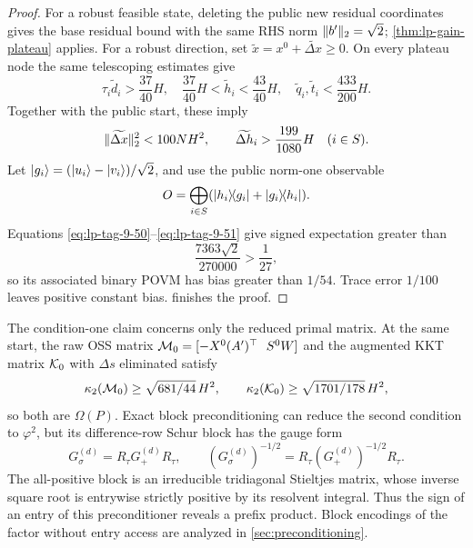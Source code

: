 \begin{proof}
For a robust feasible state, deleting the public new residual coordinates
gives the base residual bound with the same RHS norm
\(\lVert b'\rVert_2=\sqrt2\); \cref{thm:lp-gain-plateau} applies.  For a
robust direction, set \(\widetilde x=x^0+\widetilde{\Delta x}\geq0\).  On
every plateau node the same telescoping estimates give
\begin{equation}
 \tau_i\widetilde d_i>\frac{37}{40}H,\quad
 \frac{37}{40}H<\widetilde h_i<\frac{43}{40}H,\quad
 \widetilde q_i,\widetilde t_i<\frac{433}{200}H.
\label{eq:lp-tag-9-50}
\end{equation}
Together with the public start, these imply
\begin{equation}
 \lVert\widetilde{\Delta x}\rVert_2^2<100NH^2,\qquad
 \widetilde{\Delta h}_i>\frac{199}{1080}H
 \quad(i\in S).
\label{eq:lp-tag-9-51}
\end{equation}
Let \(\lvert g_i\rangle=(\lvert u_i\rangle-\lvert v_i\rangle)/\sqrt2\), and use the public norm-one
observable
\begin{equation}
 O=\bigoplus_{i\in S}
 (\lvert h_i\rangle\!\langle g_i\rvert+\lvert g_i\rangle\!\langle h_i\rvert).
\end{equation}
Equations \eqref{eq:lp-tag-9-50}--\eqref{eq:lp-tag-9-51} give signed expectation greater than
\begin{equation}
 \frac{7363\sqrt2}{270000}>\frac1{27},
\end{equation}
so its associated binary POVM has bias greater than \(1/54\).  Trace error
\(1/100\) leaves positive constant bias.  
finishes the proof.
\end{proof}

The condition-one claim concerns only the reduced primal matrix.  At the
same start,
the raw OSS matrix \({\cal M}_0=[-X^0(A')^\top\ \ S^0W]\) and the augmented
KKT matrix \({\cal K}_0\) with \(\Delta s\) eliminated satisfy
\begin{equation}
 \kappa_2({\cal M}_0)\geq\sqrt{681/44}\,H^2,
 \qquad
 \kappa_2({\cal K}_0)\geq\sqrt{1701/178}\,H^2,
\end{equation}
so both are \(\Omega(P)\).  Exact block preconditioning can reduce the
second condition to \(\varphi^2\), but its difference-row Schur block has
the gauge form
\begin{equation}
 G_\sigma^{(d)}=R_\tau G_+^{(d)}R_\tau,\qquad
 (G_\sigma^{(d)})^{-1/2}
 =R_\tau(G_+^{(d)})^{-1/2}R_\tau.
\end{equation}
The all-positive block is an irreducible tridiagonal Stieltjes matrix, whose
inverse square root is entrywise strictly positive by its resolvent integral.
Thus the sign of an entry of this preconditioner reveals a prefix product.
Block encodings of the factor without entry access are analyzed in
\cref{sec:preconditioning}.

